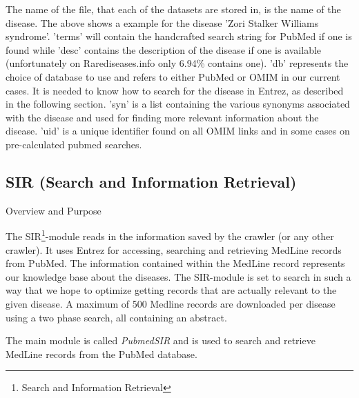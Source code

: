 The name of the file, that each of the datasets are stored in, is the name of the disease. The above shows a example for the disease 'Zori Stalker Williams syndrome'. 'terms' will contain the handcrafted search string for PubMed if one is found while 'desc' contains the description of the disease if one is available (unfortunately on Rarediseases.info only 6.94\% contains one). 'db' represents the choice of database to use and refers to either PubMed or OMIM in our current cases. It is needed to know how to search for the disease in Entrez, as described in the following section. 'syn' is a list containing the various synonyms associated with the disease and used for finding more relevant information about the disease. 'uid' is a unique identifier found on all OMIM links and in some cases on pre-calculated pubmed searches.

\subsection{SIR (Search and Information Retrieval)\label{SIR}}

Overview and Purpose

The SIR\footnote{Search and Information Retrieval}-module reads in the information saved by the crawler (or any other crawler). It uses Entrez for accessing, searching and retrieving MedLine records from PubMed. The information contained within the MedLine record represents our knowledge base about the diseases. The SIR-module is set to search in such a way that we hope to optimize getting records that are actually relevant to the given disease. A maximum of 500 Medline records are downloaded per disease using a two phase search, all containing an abstract.

The main module is called \textit{PubmedSIR} and is used to search and retrieve MedLine records from the PubMed database.

